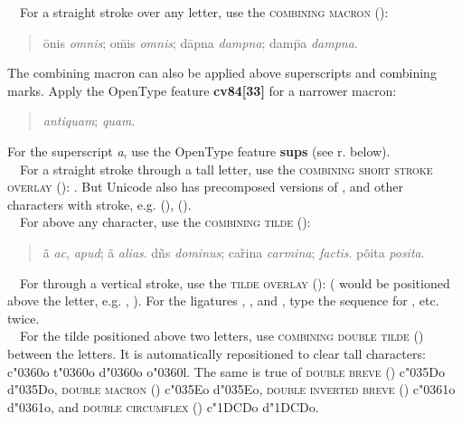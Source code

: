 \noindent{}\ \ For a straight stroke over any letter, use the \textsc{combining macron} ():
\begin{quote}
\=onis \textit{omnis}; o\={m}is \textit{omnis}; d\=apna \textit{dampna}; dam\={p}a
\textit{dampna}.
\end{quote}
The combining macron can also be applied above superscripts and combining marks. Apply the OpenType feature
\textbf{cv84[33]} for a narrower macron:
\begin{quote}
 \textit{antiquam};  \textit{quam}.
\end{quote}
For the superscript \textit{a}, use the OpenType feature \textbf{sups} (see r. below).\\[1ex]

\noindent{}\ \ For a straight stroke through a tall letter, use the \textsc{combining short stroke overlay} (): . But Unicode also has precomposed versions of
,  and other characters \mbox{with} stroke, e.g.
\textex{{\dj}} (),  ().\\[1ex]

\noindent{}\ \ For \textex{\~{}} above any character, use the \textsc{combining tilde} ():
\begin{quote}
\~a \textit{ac}, \textit{apud}; \~a \textit{alias}.\newline
d\~ns \textit{dominus}; ca\~{r}ina \textit{carmina};  \textit{factis}.\newline
p\~oita \textit{posita}.
\end{quote}

\noindent{}\ \ For \textex{\~{}} through a vertical stroke, use the \textsc{tilde overlay} ():
 ( would be positioned above the letter, e.g.
, ). For the ligatures
, , and , type the
sequence for , etc. twice.\\[1ex]

\noindent{}\ \ For the tilde positioned above two letters, use \textsc{combining double tilde}
() between the letters. It is
automatically repositioned to clear tall characters: c\char"0360o t\char"0360o d\char"0360o o\char"0360l. The same is true of
\textsc{double breve} () c\char"035Do d\char"035Do, \textsc{double macron} () c\char"035Eo d\char"035Eo,
\textsc{double inverted breve} () c\char"0361o d\char"0361o, and \textsc{double circumflex} ()
c\char"1DCDo d\char"1DCDo.\\[1ex]


